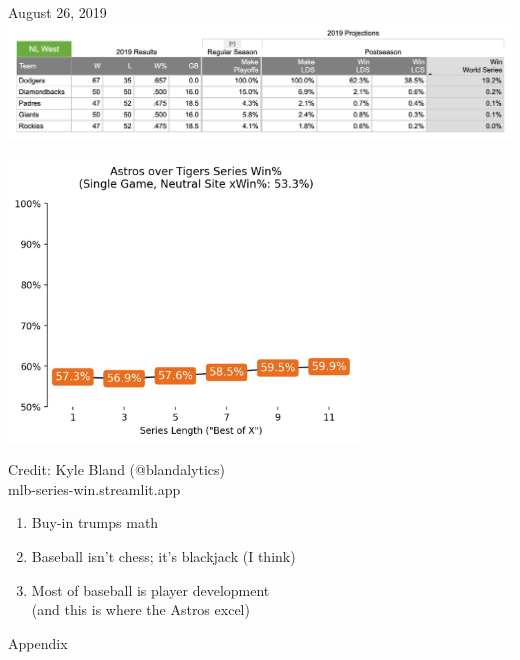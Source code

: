 \documentclass{beamer}
\begin{document}
\begin{frame}{August 26, 2019}
  \includegraphics[width = \textwidth]{images/2019-07-21.png}
\end{frame}

\begin{frame}
  \begin{center}
    \includegraphics[width = 0.7\textwidth]{images/bland.jpg}\\
  \end{center}
  \footnotesize
  \hfill Credit: Kyle Bland (@blandalytics)\\
  \hfill mlb-series-win.streamlit.app
\end{frame}

\begin{frame}
  \begin{enumerate}
    \item Buy-in trumps math
    \item Baseball isn't chess; it's blackjack (I think)
    \item Most of baseball is player development\\
      (and this is where the Astros excel)
  \end{enumerate}
\end{frame}

\begin{frame}
  Appendix
\end{frame}
\end{document}
